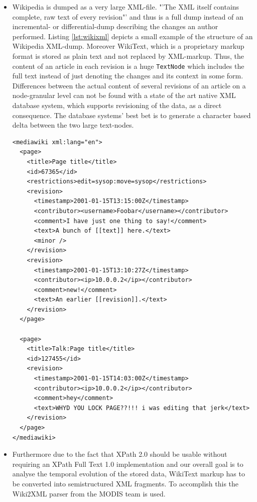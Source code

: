 \begin{itemize}
\item Wikipedia is dumped as a very large XML-file. "'The XML itself contains complete, raw text of every revision"' \cite{WikiDump} and thus is a full dump instead of an incremental- or differential-dump describing the changes an author performed. Listing \ref{lst:wikixml} depicts a small example of the structure of an Wikipedia XML-dump. Moreover WikiText, which is a proprietary markup format is stored as plain text and not replaced by XML-markup. Thus, the content of an article in each revision is a huge \texttt{TextNode} which includes the full text instead of just denoting the changes and its context in some form. Differences between the actual content of several revisions of an article on a node-granular level can not be found with a state of the art native XML database system, which supports revisioning of the data, as a direct consequence. The database systems' best bet is to generate a character based delta between the two large text-nodes.

\begin{lstlisting}[caption=Wikipedia Dump - XML representation]
<mediawiki xml:lang="en">
  <page>
    <title>Page title</title>
    <id>67365</id>
    <restrictions>edit=sysop:move=sysop</restrictions>
    <revision>
      <timestamp>2001-01-15T13:15:00Z</timestamp>
      <contributor><username>Foobar</username></contributor>
      <comment>I have just one thing to say!</comment>
      <text>A bunch of [[text]] here.</text>
      <minor />
    </revision>
    <revision>
      <timestamp>2001-01-15T13:10:27Z</timestamp>
      <contributor><ip>10.0.0.2</ip></contributor>
      <comment>new!</comment>
      <text>An earlier [[revision]].</text>
    </revision>
  </page>
    
  <page>
    <title>Talk:Page title</title>
    <id>127455</id>
    <revision>
      <timestamp>2001-01-15T14:03:00Z</timestamp>
      <contributor><ip>10.0.0.2</ip></contributor>
      <comment>hey</comment>
      <text>WHYD YOU LOCK PAGE??!!! i was editing that jerk</text>
    </revision>
  </page>
</mediawiki>
\end{lstlisting}
\label{lst:wikixml}

\item Furthermore due to the fact that XPath 2.0 should be usable without requiring an XPath Full Text 1.0 implementation and our overall goal is to analyse the temporal evolution of the stored data, WikiText markup has to be converted into semistructured XML fragments. To accomplish this the Wiki2XML parser from the MODIS team \cite{Wiki2XML} is used.


\end{itemize}
